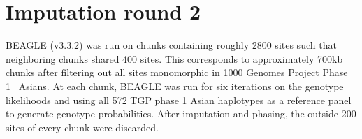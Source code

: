 \documentclass[nobib,a4paper]{tufte-handout}
\begin{document}
\section{Imputation round 2}

BEAGLE (v3.3.2) was run on chunks containing roughly 2800 sites such
that neighboring chunks shared 400 sites. This corresponds to
approximately 700kb chunks after filtering out all sites monomorphic
in 1000 Genomes Project Phase 1~\autocite{Project2012} Asians.
At each chunk, BEAGLE was run for six
iterations on the genotype likelihoods and using all 572 TGP phase 1
Asian haplotypes as a reference panel to generate genotype
probabilities.  
After imputation and phasing, the outside 200 sites of every chunk
were discarded.








\printbibliography
\end{document}

